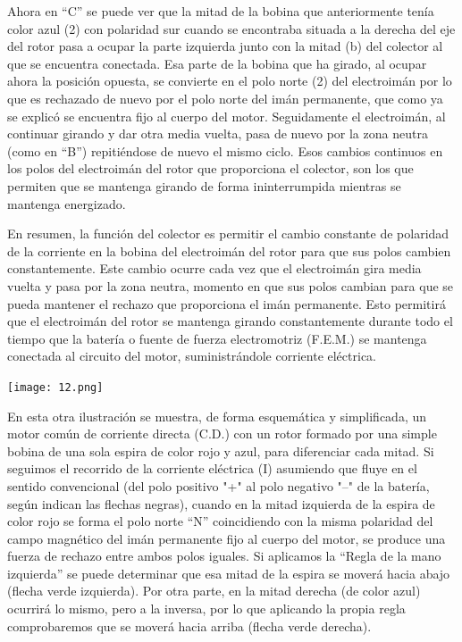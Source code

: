 \documentclass[10pt,a4paper]{article}
\begin{document}
Ahora en “C” se puede ver que la mitad de la bobina que anteriormente tenía color azul (2) con polaridad sur cuando se encontraba situada a la derecha del eje del rotor pasa a ocupar la parte izquierda junto con la mitad (b) del colector al que se encuentra conectada. Esa parte de la bobina que ha girado, al ocupar ahora la posición opuesta, se convierte en el polo norte (2) del electroimán por lo que es rechazado de nuevo por el polo norte del imán permanente, que como ya se explicó se encuentra fijo al cuerpo del motor. Seguidamente el electroimán, al continuar girando y dar otra media vuelta, pasa de nuevo por la zona neutra (como en “B”) repitiéndose de nuevo el mismo ciclo. Esos cambios continuos en los polos del electroimán del rotor que proporciona el colector, son los que permiten que se mantenga girando de forma ininterrumpida mientras se mantenga energizado.

En resumen, la función del colector es permitir el cambio constante de polaridad de la corriente en la bobina del electroimán del rotor para que sus polos cambien constantemente. Este cambio ocurre cada vez que el electroimán gira media vuelta y pasa por la zona neutra, momento en que sus polos cambian para que se pueda mantener el rechazo que proporciona el imán permanente. Esto permitirá que el electroimán del rotor se mantenga girando constantemente durante todo el tiempo que la batería o fuente de fuerza electromotriz (F.E.M.) se mantenga conectada al circuito del motor, suministrándole corriente eléctrica.\\

\begin{center}
\texttt{[image: 12.png]} 
\end{center}

 En esta otra ilustración se muestra, de forma esquemática y simplificada, un motor común de corriente directa (C.D.) con un rotor formado por una simple bobina de una sola espira de color rojo y azul, para diferenciar cada mitad. Si seguimos el recorrido de la corriente eléctrica (I) asumiendo que fluye en el sentido convencional (del polo positivo "+" al polo negativo "–" de la batería, según indican las flechas negras), cuando en la mitad izquierda de la espira de color rojo se forma el polo norte “N” coincidiendo con la misma polaridad del campo magnético del imán permanente fijo al cuerpo del motor, se produce una fuerza de rechazo entre ambos polos iguales. Si aplicamos la “Regla de la mano izquierda” se puede determinar que esa mitad de la espira se moverá hacia abajo (flecha verde izquierda). Por otra parte, en la mitad derecha (de color azul) ocurrirá lo mismo, pero a la inversa, por lo que aplicando la propia regla comprobaremos que se moverá hacia arriba (flecha verde derecha). 
\end{document}
